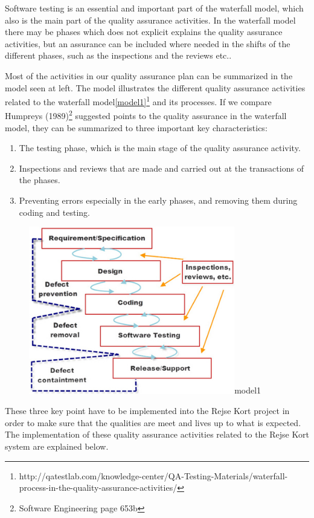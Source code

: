 Software testing is an essential and important part of the waterfall model, which also is the main part of the quality assurance activities. In the waterfall model there may be phases which does not explicit explains the quality assurance activities, but an assurance can be included where needed in the shifts of the different phases, such as the inspections and the reviews etc..



Most of the activities in our quality assurance plan can be summarized in the model seen at left. The model illustrates the different quality assurance activities related to the waterfall model\ref{model1}\footnote{http://qatestlab.com/knowledge-center/QA-Testing-Materials/waterfall-process-in-the-quality-assurance-activities/
} and its processes. If we compare Humpreys (1989)\footnote{ Software Engineering page 653b} suggested points to the quality assurance in the waterfall model, they can be summarized to three important key characteristics:
\begin{enumerate}
	\item The testing phase, which is the main stage of the quality assurance activity.
	\item Inspections and reviews that are made and carried out at the transactions of the phases.
	\item Preventing errors especially in the early phases, and removing them during coding and testing.
\end{enumerate}

\begin{figure}[ht!]
\centering
\includegraphics[width=90mm]{graphics/model1.png}{model1}
\label{overflow}
\end{figure}

These three key point have to be implemented into the Rejse Kort project in order to make sure that the qualities are meet and lives up to what is expected. The implementation of these quality assurance activities related to the Rejse Kort system are explained below.



